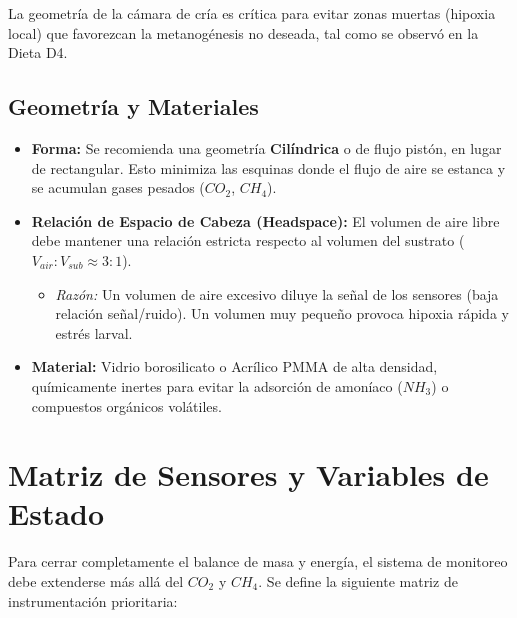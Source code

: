 La geometría de la cámara de cría es crítica para evitar zonas muertas (hipoxia local) que favorezcan la metanogénesis no deseada, tal como se observó en la Dieta D4.

\subsection{Geometría y Materiales}
\begin{itemize}
    \item \textbf{Forma:} Se recomienda una geometría \textbf{Cilíndrica} o de flujo pistón, en lugar de rectangular. Esto minimiza las esquinas donde el flujo de aire se estanca y se acumulan gases pesados ($CO_2$, $CH_4$).
    \item \textbf{Relación de Espacio de Cabeza (Headspace):} El volumen de aire libre debe mantener una relación estricta respecto al volumen del sustrato ($V_{air}:V_{sub} \approx 3:1$).
    \begin{itemize}
        \item \textit{Razón:} Un volumen de aire excesivo diluye la señal de los sensores (baja relación señal/ruido). Un volumen muy pequeño provoca hipoxia rápida y estrés larval.
    \end{itemize}
    \item \textbf{Material:} Vidrio borosilicato o Acrílico PMMA de alta densidad, químicamente inertes para evitar la adsorción de amoníaco ($NH_3$) o compuestos orgánicos volátiles.
\end{itemize}

\section{Matriz de Sensores y Variables de Estado}

Para cerrar completamente el balance de masa y energía, el sistema de monitoreo debe extenderse más allá del $CO_2$ y $CH_4$. Se define la siguiente matriz de instrumentación prioritaria:

